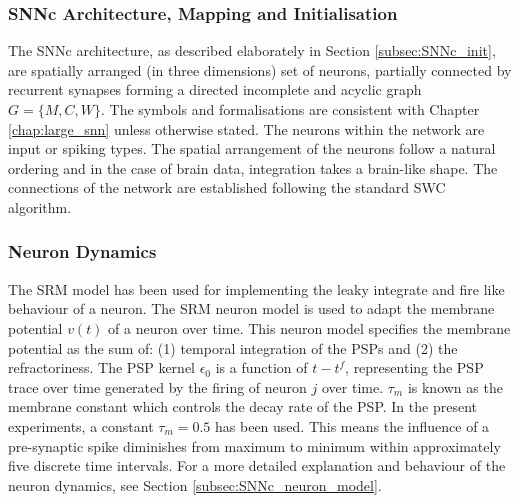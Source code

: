 \subsubsection{SNNc Architecture, Mapping and Initialisation}
The SNNc architecture, as described elaborately in Section \ref{subsec:SNNc_init}, are spatially arranged (in three dimensions) set of neurons, partially connected by recurrent synapses forming a directed incomplete and acyclic graph $G=\{M, C, W\}$. The symbols and formalisations are consistent with Chapter \ref{chap:large_snn} unless otherwise stated. The neurons within the network are input or spiking types. The spatial arrangement of the neurons follow a natural ordering and in the case of brain data, integration takes a brain-like shape. The connections of the network are established following the standard SWC \citep{kasabov2014evolving} algorithm.  

\subsubsection{Neuron Dynamics}
The SRM model has been used for implementing the leaky integrate and fire like behaviour of a neuron. The SRM neuron model is used to adapt the membrane potential $v(t)$ of a neuron over time. This neuron model specifies the membrane potential as the sum of: (1) temporal integration of the PSPs and (2) the refractoriness. The PSP kernel $\epsilon_0$ is a function of $t-t^f$, representing the PSP trace over time generated by the firing of neuron $j$ over time. $\tau_m$  is known as the membrane constant which controls the decay rate of the PSP. In the present experiments, a constant $\tau_m = 0.5$ has been used. This means the influence of a pre-synaptic spike diminishes from maximum to minimum within approximately five discrete time intervals. For a more detailed explanation and behaviour of the neuron dynamics, see Section \ref{subsec:SNNc_neuron_model}.

